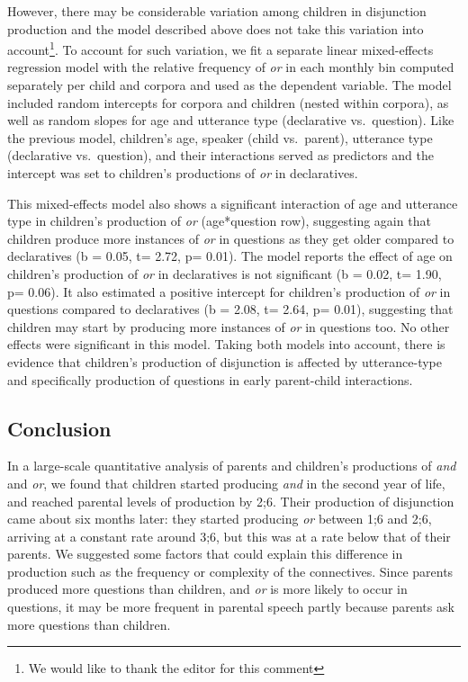 \documentclass[
  ,man,floatsintext]{apa6}
\begin{document}
However, there may be considerable variation among children in disjunction production and the model described above does not take this variation into account\footnote{We would like to thank the editor for this comment}. To account for such variation, we fit a separate linear mixed-effects regression model with the relative frequency of \emph{or} in each monthly bin computed separately per child and corpora and used as the dependent variable. The model included random intercepts for corpora and children (nested within corpora), as well as random slopes for age and utterance type (declarative vs.~question). Like the previous model, children's age, speaker (child vs.~parent), utterance type (declarative vs.~question), and their interactions served as predictors and the intercept was set to children's productions of \emph{or} in declaratives.

This mixed-effects model also shows a significant interaction of age and utterance type in children's production of \emph{or} (age*question row), suggesting again that children produce more instances of \emph{or} in questions as they get older compared to declaratives (b = 0.05, t= 2.72, p= 0.01). The model reports the effect of age on children's production of \emph{or} in declaratives is not significant (b = 0.02, t= 1.90, p= 0.06). It also estimated a positive intercept for children's production of \emph{or} in questions compared to declaratives (b = 2.08, t= 2.64, p= 0.01), suggesting that children may start by producing more instances of \emph{or} in questions too. No other effects were significant in this model. Taking both models into account, there is evidence that children's production of disjunction is affected by utterance-type and specifically production of questions in early parent-child interactions.

\hypertarget{study1discussion}{%
\subsection{Conclusion}\label{study1discussion}}

In a large-scale quantitative analysis of parents and children's productions of \emph{and} and \emph{or}, we found that children started producing \emph{and} in the second year of life, and reached parental levels of production by 2;6. Their production of disjunction came about six months later: they started producing \emph{or} between 1;6 and 2;6, arriving at a constant rate around 3;6, but this was at a rate below that of their parents. We suggested some factors that could explain this difference in production such as the frequency or complexity of the connectives. Since parents produced more questions than children, and \emph{or} is more likely to occur in questions, it may be more frequent in parental speech partly because parents ask more questions than children.
\end{document}
